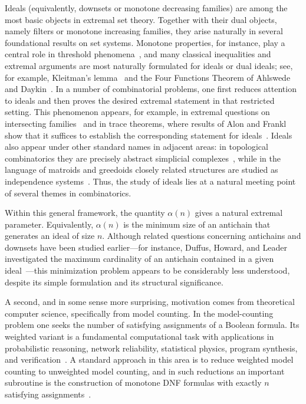 \documentclass[11pt]{article}
\theoremstyle{definition}
\theoremstyle{remark}
\begin{document}
Ideals (equivalently, downsets or monotone decreasing families) are among the most basic objects in extremal set theory. Together with their dual objects, namely filters or monotone increasing families, they arise naturally in several foundational results on set systems. Monotone properties, for instance, play a central role in threshold phenomena~\cite{BollobasThomason87}, and many classical inequalities and extremal arguments are most naturally formulated for ideals or dual ideals; see, for example, Kleitman's lemma~\cite{Kleitman66a} and the Four Functions Theorem of Ahlswede and Daykin~\cite{AhlswedeDaykin78}. In a number of combinatorial problems, one first reduces attention to ideals and then proves the desired extremal statement in that restricted setting. This phenomenon appears, for example, in extremal questions on intersecting families~\cite{Kleitman66b,Bollobas86} and in trace theorems, where results of Alon and Frankl show that it suffices to establish the corresponding statement for ideals~\cite{Alon83,Frankl83}. Ideals also appear under other standard names in adjacent areas: in topological combinatorics they are precisely abstract simplicial complexes~\cite{Kozlov08}, while in the language of matroids and greedoids closely related structures are studied as independence systems~\cite{KorteLovaszSchrader91}. Thus, the study of ideals lies at a natural meeting point of several themes in combinatorics.

Within this general framework, the quantity $\alpha(n)$ gives a natural extremal parameter. Equivalently, $\alpha(n)$ is the minimum size of an antichain that generates an ideal of size $n$. Although related questions concerning antichains and downsets have been studied earlier---for instance, Duffus, Howard, and Leader investigated the maximum cardinality of an antichain contained in a given ideal~\cite{DuffusHowardLeader19}---this minimization problem appears to be considerably less understood, despite its simple formulation and its structural significance.

A second, and in some sense more surprising, motivation comes from theoretical computer science, specifically from model counting. In the model-counting problem one seeks the number of satisfying assignments of a Boolean formula. Its weighted variant is a fundamental computational task with applications in probabilistic reasoning, network reliability, statistical physics, program synthesis, and verification~\cite{Roth96,SangEtAl04,DomshlakHoffmann07,XueChoiDarwiche12}. A standard approach in this area is to reduce weighted model counting to unweighted model counting, and in such reductions an important subroutine is the construction of monotone DNF formulas with exactly $n$ satisfying assignments~\cite{ChakrabortyFriedMeelVardi15}.
\end{document}
